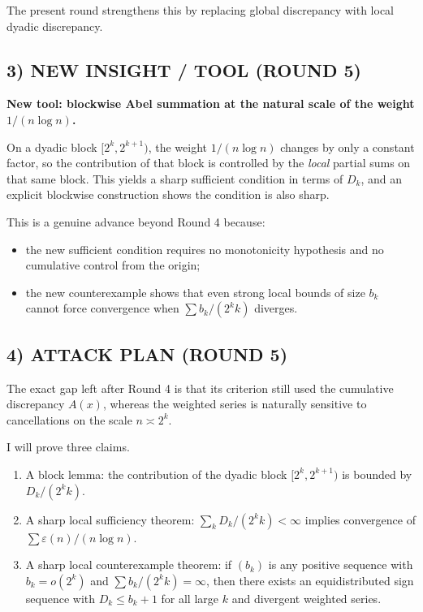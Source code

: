 The present round strengthens this by replacing global discrepancy with local dyadic discrepancy.

\subsection{3) NEW INSIGHT / TOOL (ROUND 5)}

\textbf{New tool: blockwise Abel summation at the natural scale of the weight \(1/(n\log n)\).}

On a dyadic block \([2^k,2^{k+1})\), the weight \(1/(n\log n)\) changes by only a constant factor, so the contribution of that block is controlled by the \emph{local} partial sums on that same block.  This yields a sharp sufficient condition in terms of \(D_k\), and an explicit blockwise construction shows the condition is also sharp.

This is a genuine advance beyond Round 4 because:
\begin{itemize}
\item the new sufficient condition requires no monotonicity hypothesis and no cumulative control from the origin;
\item the new counterexample shows that even strong local bounds of size \(b_k\) cannot force convergence when \(\sum b_k/(2^k k)\) diverges.
\end{itemize}

\subsection{4) ATTACK PLAN (ROUND 5)}

The exact gap left after Round 4 is that its criterion still used the cumulative discrepancy \(A(x)\), whereas the weighted series is naturally sensitive to cancellations on the scale \(n\asymp 2^k\).

I will prove three claims.
\begin{enumerate}
\item A block lemma: the contribution of the dyadic block \([2^k,2^{k+1})\) is bounded by \(D_k/(2^k k)\).
\item A sharp local sufficiency theorem: \(\sum_k D_k/(2^k k)<\infty\) implies convergence of \(\sum \varepsilon(n)/(n\log n)\).
\item A sharp local counterexample theorem: if \((b_k)\) is any positive sequence with \(b_k=o(2^k)\) and \(\sum b_k/(2^k k)=\infty\), then there exists an equidistributed sign sequence with \(D_k\le b_k+1\) for all large \(k\) and divergent weighted series.
\end{enumerate}

